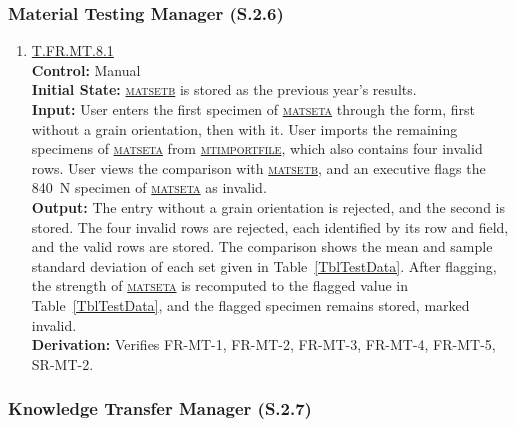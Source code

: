 \documentclass[12pt, titlepage]{article}
\newcommand{\testdef}[1]{\leavevmode\hypertarget{test:#1}{}\hyperlink{trace:#1}{#1}}
\DeclareRobustCommand{\cname}[1]{{\renewcommand{\_}{\textunderscore\allowbreak}\textsc{#1}}}
\newcommand{\constfirst}[1]{\leavevmode\hypertarget{constfirst:\detokenize{#1}}{}\hyperlink{const:\detokenize{#1}}{\cname{#1}}}
\newcommand{\const}[1]{\hyperlink{const:\detokenize{#1}}{\cname{#1}}}
\begin{document}
\subsubsection{Material Testing Manager (S.2.6)}

\begin{enumerate}

\item \testdef{T.FR.MT.8.1}\\
\textbf{Control:} Manual\\
\textbf{Initial State:} \const{mat\_set\_b} is stored as the previous year's
results.\\
\textbf{Input:} User enters the first specimen of \const{mat\_set\_a} through the
form, first without a grain orientation, then with it. User imports the remaining
specimens of \const{mat\_set\_a} from \constfirst{mt\_import\_file}, which also
contains four invalid rows. User views the comparison with \const{mat\_set\_b},
and an executive flags the 840~N specimen of \const{mat\_set\_a} as invalid.\\
\textbf{Output:} The entry without a grain orientation is rejected, and the second
is stored. The four invalid rows are rejected, each identified by its row and
field, and the valid rows are stored. The comparison shows the mean and sample
standard deviation of each set given in Table~\ref{TblTestData}. After flagging,
the strength of \const{mat\_set\_a} is recomputed to the flagged value in
Table~\ref{TblTestData}, and the flagged specimen remains stored, marked
invalid.\\
\textbf{Derivation:} Verifies FR-MT-1, FR-MT-2, FR-MT-3, FR-MT-4, FR-MT-5,
SR-MT-2.

\end{enumerate}

\subsubsection{Knowledge Transfer Manager (S.2.7)}
\end{document}
